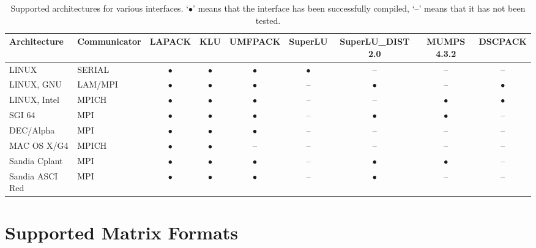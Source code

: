 \documentclass[11pt]{SANDreport}
\begin{document}
\begin{sidewaystable}[tbhp]
  \centering
  \begin{tabular}{| l  l | c | c | c | c | c | c| c|}
    \hline
    Architecture & Communicator & LAPACK  & KLU       & UMFPACK   & SuperLU &  SuperLU\_DIST 2.0
                                                                                          & MUMPS 4.3.2 & DSCPACK\\
    \hline
    LINUX           & SERIAL  & $\bullet$ & $\bullet$ & $\bullet$ & $\bullet$ & --        & --        & --        \\
    LINUX, GNU      & LAM/MPI & $\bullet$ & $\bullet$ & $\bullet$ & --        & $\bullet$ & --        & $\bullet$ \\
    LINUX, Intel    & MPICH   & $\bullet$ & $\bullet$ & $\bullet$ & --        & --        & $\bullet$ & $\bullet$ \\
    SGI 64          & MPI     & $\bullet$ & $\bullet$ & $\bullet$ & --        & $\bullet$ & $\bullet$ & --        \\
    DEC/Alpha       & MPI     & $\bullet$ & $\bullet$ & $\bullet$ & --        & --        & --        & --        \\
    MAC OS X/G4     & MPICH   & $\bullet$ & $\bullet$   & --      & --        & --        & --        & --        \\
    Sandia Cplant   & MPI     & $\bullet$ & $\bullet$ & $\bullet$ & --        & $\bullet$ & $\bullet$ & --        \\
    Sandia ASCI Red & MPI     & $\bullet$ & $\bullet$ & $\bullet$ & --        & $\bullet$ & --        & --        \\
    \hline
  \end{tabular}
  \caption{Supported architectures for various interfaces. 
  `$\bullet$' means that the interface has been successfully compiled, 
  `--' means that it has not been tested.}
  \label{tab:arch}
\end{sidewaystable}

\section{Supported Matrix Formats}
\label{sec:matrix}
\end{document}

